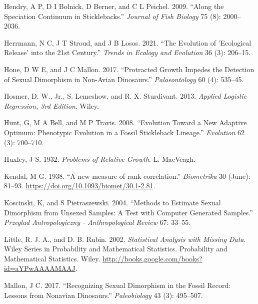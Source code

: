 \documentclass[
  12pt,
]{article}
\newlength{\cslhangindent}
\newlength{\cslentryspacingunit} %
\newenvironment{CSLReferences}[2] %
 {%
  \setlength{\parindent}{0pt}
  \ifodd #1
  \let\oldpar\par
  \def\par{\hangindent=\cslhangindent\oldpar}
  \fi
  \setlength{\parskip}{#2\cslentryspacingunit}
 }%
 {}
\begin{document}
\begin{CSLReferences}{1}{0}
\leavevmode{}%
Hendry, A P, D I Bolnick, D Berner, and C L Peichel. 2009. {``Along the
Speciation Continuum in Sticklebacks.''} \emph{Journal of Fish Biology}
75 (8): 2000--2036.

\leavevmode{}%
Herrmann, N C, J T Stroud, and J B Losos. 2021. {``The Evolution of
'Ecological Release' into the 21st Century.''} \emph{Trends in Ecology
and Evolution} 36 (3): 206--15.

\leavevmode{}%
Hone, D W E, and J C Mallon. 2017. {``Protracted Growth Impedes the
Detection of Sexual Dimorphism in Non-Avian Dinosaurs.''}
\emph{Palaeontology} 60 (4): 535--45.

\leavevmode{}%
Hosmer, D. W., Jr., S. Lemeshow, and R. X. Sturdivant. 2013.
\emph{Applied Logistic Regression, 3rd Edition}. Wiley.

\leavevmode{}%
Hunt, G, M A Bell, and M P Travis. 2008. {``Evolution Toward a New
Adaptive Optimum: Phenotypic Evolution in a Fossil Stickleback
Lineage.''} \emph{Evolution} 62 (3): 700--710.

\leavevmode{}%
Huxley, J S. 1932. \emph{Problems of Relative Growth}. L. MacVeagh.

\leavevmode{}%
Kendal, M G. 1938. {``{A new measure of rank correlation}.''}
\emph{Biometrika} 30 (June): 81--93.
\url{https://doi.org/10.1093/biomet/30.1-2.81}.

\leavevmode{}%
Koscinski, K, and S Pietraszewski. 2004. {``Methods to Estimate Sexual
Dimorphism from Unsexed Samples: A Test with Computer Generated
Samples.''} \emph{Przeglad Antropologiczny - Anthropological Review} 67:
33--55.

\leavevmode{}%
Little, R. J. A., and D. B. Rubin. 2002. \emph{Statistical Analysis with
Missing Data}. Wiley Series in Probability and Mathematical Statistics.
Probability and Mathematical Statistics. Wiley.
\url{http://books.google.com/books?id=aYPwAAAAMAAJ}.

\leavevmode{}%
Mallon, J C. 2017. {``Recognizing Sexual Dimorphism in the Fossil
Record: Lessons from Nonavian Dinosaurs.''} \emph{Paleobiology} 43 (3):
495--507.


\end{CSLReferences}
\end{document}
